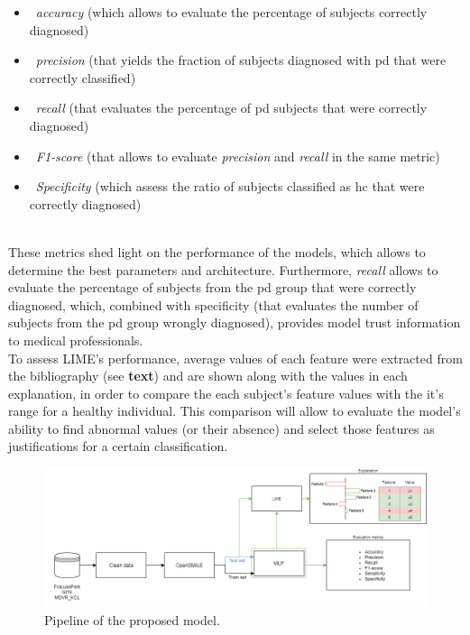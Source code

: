 \begin{itemize}
	\item ~\textit{accuracy} (which allows to evaluate the percentage of subjects correctly diagnosed)
	\item ~\textit{precision} (that yields the fraction of subjects diagnosed with \gls{pd} that were correctly classified)
	\item ~\textit{recall} (that evaluates the percentage of \gls{pd} subjects that were correctly diagnosed)
	\item ~\textit{F1-score} (that allows to evaluate \textit{precision} and \textit{recall} in the same metric)
	\item ~\textit{Specificity} (which assess the ratio of subjects classified as \gls{hc} that were correctly diagnosed)
\end{itemize}
\\
These metrics shed light on the performance of the models, which allows to determine the best parameters and architecture. Furthermore, \textit{recall} allows to evaluate the percentage of subjects from the \gls{pd} group that were correctly diagnosed, which, combined with specificity (that evaluates the number of subjects from the \gls{pd} group wrongly diagnosed), provides model trust information to medical professionals.
\\
To assess LIME's performance, average values of each feature were extracted from the bibliography (see \textbf{text}) and are shown along with the values in each explanation, in order to compare the each subject's feature values with the it's range for a healthy individual. This comparison will allow to evaluate the model's ability to find abnormal values (or their absence) and select those features as justifications for a certain classification.

\begin{figure}[t]
	\begin{center}
		\includegraphics[clip=true, width=\textwidth]{figs/pipeline.png}
	\end{center}
	\caption{Pipeline of the proposed model.}
	\label{pipeline}
\end{figure}

\pagebreak